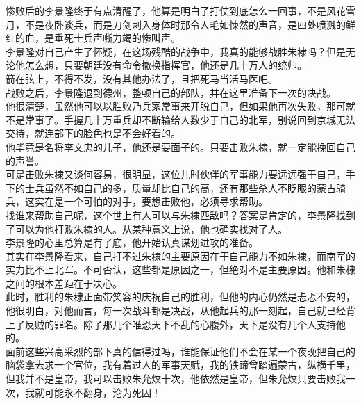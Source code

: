 \begin{multicols}{\theparacolNo}
惨败后的李景隆终于有点清醒了，他算是明白了打仗到底怎么一回事，不是风花雪月，不是夜卧谈兵，而是刀剑刺入身体时那令人毛如悚然的声音，是四处喷溅的鲜红的血，是垂死士兵声嘶力竭的惨叫声。\\

李景隆对自己产生了怀疑，在这场残酷的战争中，我真的能够战胜朱棣吗？但是无论他怎么想，只要朝廷没有命令撤换指挥官，他还是几十万人的统帅。\\

箭在弦上，不得不发，没有其他办法了，且把死马当活马医吧。\\

战败之后，李景隆退到德州，整顿自己的部队，并在这里准备下一次的决战。\\

他很清楚，虽然他可以以胜败乃兵家常事来开脱自己，但如果他再次失败，那可就不是常事了。手握几十万重兵却不断输给人数少于自己的北军，别说回到京城无法交待，就连部下的脸色也是不会好看的。\\

他毕竟是名将李文忠的儿子，他还是要面子的。只要击败朱棣，就一定能挽回自己的声誉。\\

可是击败朱棣又谈何容易，很明显，这位儿时伙伴的军事能力要远远强于自己，手下的士兵虽然不如自己的多，质量却比自己的高，还有那些杀人不眨眼的蒙古骑兵，这实在是一个可怕的对手，要想击败他，必须寻求帮助。\\

找谁来帮助自己呢，这个世上有人可以与朱棣匹敌吗？答案是肯定的，李景隆找到了可以为他打败朱棣的人。从某种意义上说，他也确实找对了人。\\

李景隆的心里总算是有了底，他开始认真谋划进攻的准备。\\

其实在李景隆看来，自己打不过朱棣的主要原因在于自己能力不如朱棣，而南军的实力比不上北军。不可否认，这些都是原因之一，但绝对不是主要原因。他和朱棣之间的根本差距在于决心。\\

此时，胜利的朱棣正面带笑容的庆祝自己的胜利，但他的内心仍然是忐忑不安的，他很明白，对他而言，每一次战斗都是决战，从他起兵的那一刻起，自己就已经背上了反贼的罪名。除了那几个唯恐天下不乱的心腹外，天下是没有几个人支持他的。\\

面前这些兴高采烈的部下真的信得过吗，谁能保证他们不会在某一个夜晚把自己的脑袋拿去求一个官位，我有着过人的军事天赋，我的铁蹄曾踏遍蒙古，纵横千里，但我并不是皇帝，我可以击败朱允炆十次，他依然是皇帝，但朱允炆只要击败我一次，我就可能永不翻身，沦为死囚！\\


\end{multicols}
